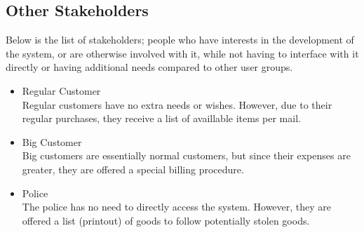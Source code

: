 \documentclass{article}
\begin{document}
\subsection*{Other Stakeholders}
Below is the list of stakeholders; people who have interests in the development of the system, or are otherwise involved with it, while not having to interface with it directly or having additional needs compared to other user groups.
\begin{itemize}
	\item Regular Customer\\
		Regular customers have no extra needs or wishes. However, due to their regular purchases, they receive a list of availlable items per mail.
	\item Big Customer\\
		Big customers are essentially normal customers, but since their expenses are greater, they are offered a special billing procedure.
	\item Police\\
		The police has no need to directly access the system. However, they are offered a list (printout) of goods to follow potentially stolen goods.
\end{itemize}
\end{document}
